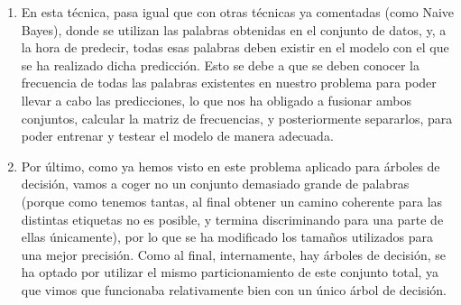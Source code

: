 \documentclass[spanish,]{article}
\newenvironment{Shaded}{\begin{snugshade}}{\end{snugshade}}
\newcommand{\KeywordTok}[1]{\textcolor[rgb]{0.13,0.29,0.53}{\textbf{#1}}}
\newcommand{\DecValTok}[1]{\textcolor[rgb]{0.00,0.00,0.81}{#1}}
\newcommand{\StringTok}[1]{\textcolor[rgb]{0.31,0.60,0.02}{#1}}
\newcommand{\CommentTok}[1]{\textcolor[rgb]{0.56,0.35,0.01}{\textit{#1}}}
\newcommand{\OperatorTok}[1]{\textcolor[rgb]{0.81,0.36,0.00}{\textbf{#1}}}
\newcommand{\NormalTok}[1]{#1}
\begin{document}
\begin{enumerate}
\def\labelenumi{\arabic{enumi}.}
\setcounter{enumi}{1}
\item
  En esta técnica, pasa igual que con otras técnicas ya comentadas (como
  Naive Bayes), donde se utilizan las palabras obtenidas en el conjunto
  de datos, y, a la hora de predecir, todas esas palabras deben existir
  en el modelo con el que se ha realizado dicha predicción. Esto se debe
  a que se deben conocer la frecuencia de todas las palabras existentes
  en nuestro problema para poder llevar a cabo las predicciones, lo que
  nos ha obligado a fusionar ambos conjuntos, calcular la matriz de
  frecuencias, y posteriormente separarlos, para poder entrenar y
  testear el modelo de manera adecuada.
\item
  Por último, como ya hemos visto en este problema aplicado para árboles
  de decisión, vamos a coger no un conjunto demasiado grande de palabras
  (porque como tenemos tantas, al final obtener un camino coherente para
  las distintas etiquetas no es posible, y termina discriminando para
  una parte de ellas únicamente), por lo que se ha modificado los
  tamaños utilizados para una mejor precisión. Como al final,
  internamente, hay árboles de decisión, se ha optado por utilizar el
  mismo particionamiento de este conjunto total, ya que vimos que
  funcionaba relativamente bien con un único árbol de decisión.
\end{enumerate}

\begin{Shaded}
\end{Shaded}
\end{document}
